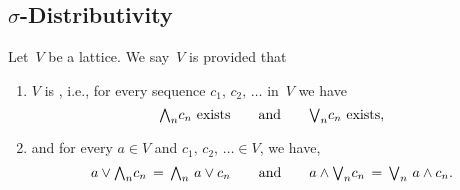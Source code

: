 \subsection{$\sigma$-Distributivity}
\label{SS:sigma-distributive}
%
% 
\begin{dfn}
\label{D:sigma-distributive}
Let~$V$ be a lattice.
We say~$V$ is
provided that
\begin{enumerate}
\item
$V$ is , i.e.,
for every sequence $c_1,\,c_2,\,\dotsc$ in~$V$
we have 
\begin{equation*}
\text{ $\textstyle{\bigwedge}_n c_n$ exists\qquad and\qquad $\textstyle{\bigvee}_n c_n$ exists, }
\end{equation*}
\item
and for every  $a\in V$ and $c_1,\,c_2,\,\dotsc\in V$,
we have,
\begin{equation*}
a \vee \textstyle{\bigwedge}_n c_n \,=\, \textstyle{\bigwedge}_n\  a\vee c_n
\qquad\text{and}\qquad
a \wedge \textstyle{\bigvee}_n c_n \,=\, \textstyle{\bigvee}_n\  a\wedge c_n.
\end{equation*}
\end{enumerate}
\end{dfn}
